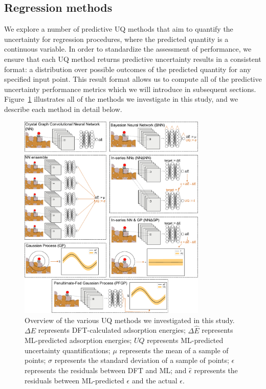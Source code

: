 \documentclass[]{achemso}
\begin{document}
\subsection{Regression methods}

We explore a number of predictive \gls{UQ} methods that aim to quantify the uncertainty for regression procedures, where the predicted quantity is a continuous variable.
In order to standardize the assessment of performance, we ensure that each \gls{UQ} method returns predictive uncertainty results in a consistent format:  a distribution over possible outcomes of the predicted quantity for any specified input point.
This result format allows us to compute all of the predictive uncertainty performance metrics which we will introduce in subsequent sections.
Figure~\ref{fig:methods} illustrates all of the methods we investigate in this study, and we describe each method in detail below.

\begin{figure}
    \centering
    \includegraphics[width=0.8\textwidth]{methods.pdf}
    \caption{Overview of the various \gls{UQ} methods we investigated in this study.
    $\Delta E$ represents \gls{DFT}-calculated adsorption energies;
    $\Delta \hat{E}$ represents \gls{ML}-predicted adsorption energies;
    $UQ$ represents \gls{ML}-predicted uncertainty quantifications;
    $\mu$ represents the mean of a sample of points;
    $\sigma$ represents the standard deviation of a sample of points;
    $\epsilon$ represents the residuals between \gls{DFT} and \gls{ML};
    and $\hat{\epsilon}$ represents the residuals between \gls{ML}-predicted $\epsilon$ and the actual $\epsilon$.
    }\label{fig:methods}
\end{figure}
\end{document}

